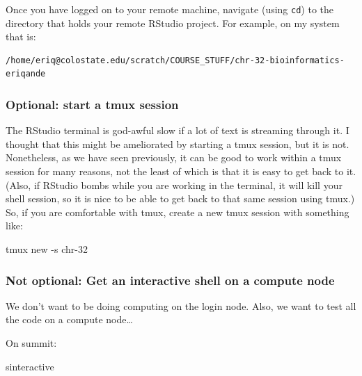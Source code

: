 \documentclass[]{krantz}
\makeatletter
\newenvironment{Shaded}{\begin{snugshade}}{\end{snugshade}}
\newcommand{\ExtensionTok}[1]{#1}
\newcommand{\NormalTok}[1]{#1}
\newenvironment{kframe}{%
\medskip{}
\setlength{\fboxsep}{.8em}
 \def\at@end@of@kframe{}%
 \ifinner\ifhmode%
  \def\at@end@of@kframe{\end{minipage}}%
  \begin{minipage}{\columnwidth}%
 \fi\fi%
 \def\FrameCommand##1{\hskip\@totalleftmargin \hskip-\fboxsep
 \colorbox{shadecolor}{##1}\hskip-\fboxsep
     \hskip-\linewidth \hskip-\@totalleftmargin \hskip\columnwidth}%
 \MakeFramed {\advance\hsize-\width
   \@totalleftmargin\z@ \linewidth\hsize
   \@setminipage}}%
 {\par\unskip\endMakeFramed%
 \at@end@of@kframe}
\renewenvironment{Shaded}{\begin{kframe}}{\end{kframe}}
\makeatother
\begin{document}
Once you have logged on to your remote machine, navigate (using \texttt{cd}) to the
directory that holds your remote RStudio project. For example, on my system that
is:

\begin{verbatim}
/home/eriq@colostate.edu/scratch/COURSE_STUFF/chr-32-bioinformatics-eriqande
\end{verbatim}

\hypertarget{optional-start-a-tmux-session}{%
\subsubsection{Optional: start a tmux session}\label{optional-start-a-tmux-session}}

The RStudio terminal is god-awful slow if a lot of text is streaming
through it. I thought that this might be ameliorated by starting a tmux session,
but it is not. Nonetheless, as we have seen previously, it can be good
to work within a tmux session for many reasons, not the least of which is that
it is easy to get back to it. (Also, if RStudio bombs while you are working in the
terminal, it will kill your shell session, so it is nice to be able to get back to
that same session using tmux.)
So, if you are comfortable with tmux, create a new tmux session with something like:

\begin{Shaded}
\begin{Highlighting}[]
\ExtensionTok{tmux}\NormalTok{ new -s chr-32}
\end{Highlighting}
\end{Shaded}

\hypertarget{not-optional-get-an-interactive-shell-on-a-compute-node}{%
\subsubsection{Not optional: Get an interactive shell on a compute node}\label{not-optional-get-an-interactive-shell-on-a-compute-node}}

We don't want to be doing computing on the login node. Also, we want to
test all the code on a compute node\ldots{}

On summit:

\begin{Shaded}
\begin{Highlighting}[]
\ExtensionTok{sinteractive}
\end{Highlighting}
\end{Shaded}
\end{document}
